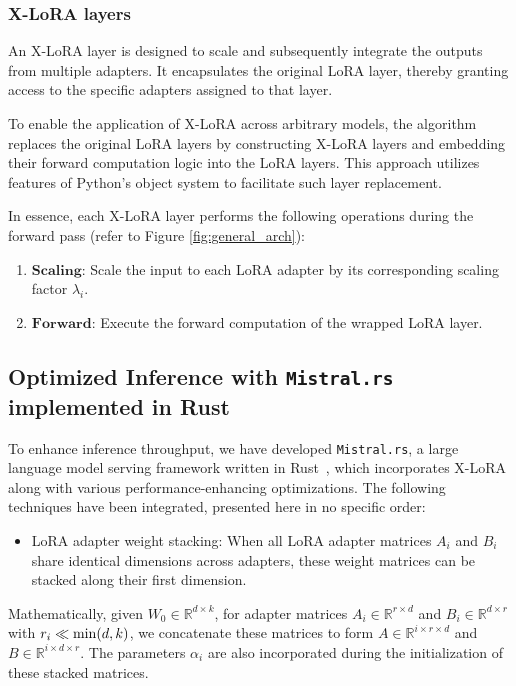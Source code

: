 \subsubsection{X-LoRA layers} An X-LoRA layer is designed to scale and subsequently integrate the outputs from multiple adapters. It encapsulates the original LoRA layer, thereby granting access to the specific adapters assigned to that layer.

To enable the application of X-LoRA across arbitrary models, the algorithm replaces the original LoRA layers by constructing X-LoRA layers and embedding their forward computation logic into the LoRA layers. This approach utilizes features of Python’s object system to facilitate such layer replacement.

In essence, each X-LoRA layer performs the following operations during the forward pass (refer to Figure \ref{fig:general_arch}):

\begin{enumerate}
    \item $\mathbf{Scaling}$: Scale the input to each LoRA adapter by its corresponding scaling factor $\lambda_i$.
    \item $\mathbf{Forward}$: Execute the forward computation of the wrapped LoRA layer.
\end{enumerate}

\subsection{Optimized Inference with \texttt{Mistral.rs} implemented in Rust} To enhance inference throughput, we have developed \texttt{Mistral.rs}, a large language model serving framework written in Rust~\cite{matsakis2014rust}, which incorporates X-LoRA along with various performance-enhancing optimizations. The following techniques have been integrated, presented here in no specific order:

\begin{itemize}
    \item LoRA adapter weight stacking: When all LoRA adapter matrices $A_i$ and $B_i$ share identical dimensions across adapters, these weight matrices can be stacked along their first dimension.
\end{itemize}

Mathematically, given $W_0 \in \mathbb{R}^{d \times k}$, for adapter matrices $A_i \in \mathbb{R}^{r \times d}$ and $B_i \in \mathbb{R}^{d \times r}$ with $r_i \ll {\rm min} (d,k)$, we concatenate these matrices to form $A\in \mathbb{R}^{i \times r \times d}$ and $B\in \mathbb{R}^{i \times d \times r}$. The parameters $\alpha_i$ are also incorporated during the initialization of these stacked matrices.


